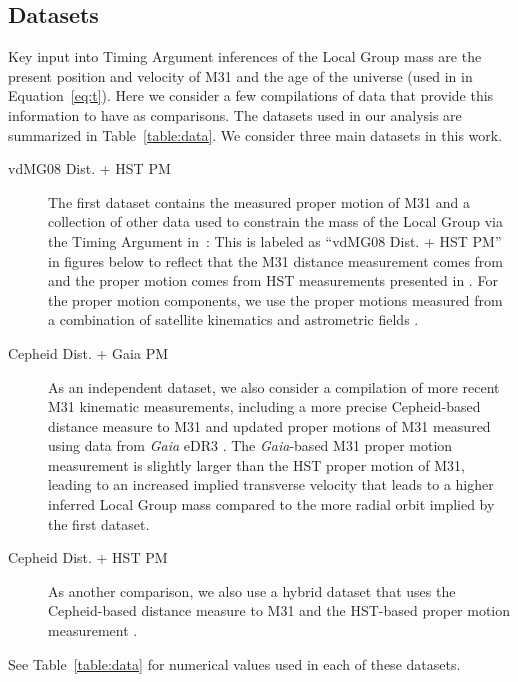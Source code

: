 \documentclass[twocolumn]{aastex631}
\begin{document}
\subsection{Datasets}
\label{sec:datasets}

Key input into Timing Argument inferences of the Local Group mass are the
present position and velocity of M31 and the age of the universe (used in in
Equation~\ref{eq:t}).
Here we consider a few compilations of data that provide this information to
have as comparisons.
The datasets used in our analysis are summarized in Table~\ref{table:data}.
We consider three main datasets in this work.
\begin{description}
  \item[vdMG08 Dist. + HST PM] The first dataset contains the measured proper
  motion of M31 and a collection of other data used to constrain the mass of the
  Local Group via the Timing Argument in~\citet{vdm2012}: This is labeled as
  ``vdMG08 Dist. + HST PM'' in figures below to reflect that the M31 distance
  measurement comes from \citet{vdm2008} and the proper motion comes from HST
  measurements presented in \citet{vdm2012}. For the proper motion components,
  we use the proper motions measured from a combination of satellite kinematics
  and astrometric fields \cite{vdm2012}.
  \item[Cepheid Dist. + Gaia PM] As an independent dataset, we also consider a
  compilation of more recent M31 kinematic measurements, including a more
  precise Cepheid-based distance measure to M31 \citep{Li2021} and updated
  proper motions of M31 measured using data from \textit{Gaia} eDR3
  \citep{Salomon2021}. The \textit{Gaia}-based M31 proper motion measurement is
  slightly larger than the HST proper motion of M31, leading to an increased
  implied transverse velocity that leads to a higher inferred Local Group mass
  compared to the more radial orbit implied by the first dataset.
  \item[Cepheid Dist. + HST PM] As another comparison, we also use a hybrid
  dataset that uses the Cepheid-based distance measure to M31 and the HST-based
  proper motion measurement \citep{Li2021,vdm2012}.
\end{description}
See Table~\ref{table:data} for numerical values used in each of these datasets.
\end{document}
